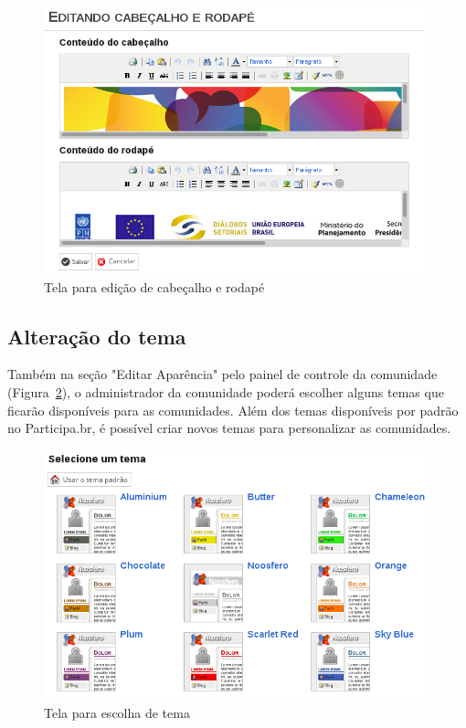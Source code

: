 \documentclass[[a4paper,11pt]{article}
\begin{document}
\begin{figure}[h]
\center
\includegraphics[scale=0.5]{editar-cabecalho-rodape.png}
\caption{Tela para edição de cabeçalho e rodapé}
\label{fig:editar-cabecalho-rodape}
\end{figure}

\subsection{Alteração do tema}

Também na seção "Editar Aparência" pelo painel de controle da comunidade 
(Figura~\ref{fig:editar-tema}), o administrador da comunidade poderá escolher
alguns temas que ficarão disponíveis para as comunidades.
Além dos temas disponíveis por padrão no Participa.br, é possível criar novos
temas para personalizar as comunidades.

\begin{figure}[h]
\center
\includegraphics[scale=0.5]{editar-tema.png}
\caption{Tela para escolha de tema}
\label{fig:editar-tema}
\end{figure}
\end{document}
